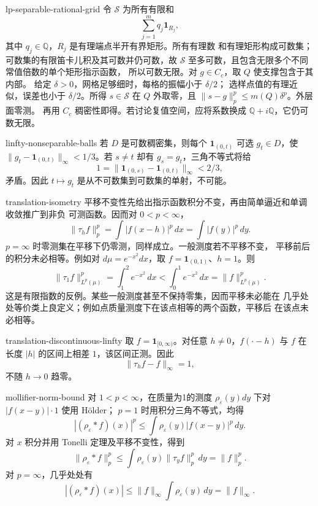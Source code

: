 \begin{solution}{lp-separable-rational-grid}
令 \(\mathcal S\) 为所有有限和
\[
 \sum_{j=1}^{m}q_j\mathbf1_{R_j},
\]
其中 \(q_j\in\mathbb Q\)，\(R_j\) 是有理端点半开有界矩形。所有有理数
和有理矩形构成可数集；可数集的有限笛卡儿积及其可数并仍可数，故
\(\mathcal S\) 至多可数，且包含无限多个不同常值倍数的单个矩形指示函数，
所以可数无限。对 \(g\in C_c\)，取 \(Q\) 使支撑包含于其内部。
给定 \(\delta>0\)，网格足够细时，每格的振幅小于 \(\delta/2\)；
选样点值的有理近似，误差也小于 \(\delta/2\)。所得 \(s\in\mathcal S\)
在 \(Q\) 外取零，且 \(\|s-g\|_p^p\le m(Q)\delta^p\)。外层面零测。
再用 \(C_c\) 稠密性即得。若讨论复值空间，应将系数换成
\(\mathbb Q+i\mathbb Q\)，它仍可数无限。
\end{solution}

\begin{solution}{linfty-nonseparable-balls}
若 \(D\) 是可数稠密集，则每个
\(\mathbf1_{(0,t)}\) 可选 \(g_t\in D\)，使
\(\|g_t-\mathbf1_{(0,t)}\|_\infty<1/3\)。若 \(s\ne t\) 却有
\(g_s=g_t\)，三角不等式将给
\[
 1=\|\mathbf1_{(0,s)}-\mathbf1_{(0,t)}\|_\infty<2/3,
\]
矛盾。因此 \(t\mapsto g_t\) 是从不可数集到可数集的单射，不可能。
\end{solution}

\begin{solution}{translation-isometry}
平移不变性先给出指示函数积分不变，再由简单逼近和单调收敛推广到非负
可测函数。因而对 \(0<p<\infty\)，
\[
 \|\tau_hf\|_p^p
 =\int|f(x-h)|^p\,dx
 =\int|f(y)|^p\,dy.
\]
\(p=\infty\) 时零测集在平移下仍零测，同样成立。一般测度若不平移不变，
平移前后的积分未必相等。例如对 \(d\mu=e^{-x^2}dx\)，取
\(f=\mathbf1_{(0,1)}\)、\(h=1\)。则
\[
 \|\tau_1f\|_{L^p(\mu)}^p=\int_1^2 e^{-x^2}\,dx
 <\int_0^1 e^{-x^2}\,dx=\|f\|_{L^p(\mu)}^p.
\]
这是有限指数的反例。某些一般测度甚至不保持零集，因而平移未必能在
几乎处处等价类上良定义；例如点质量测度下在该点相等的两个函数，平移后
在该点未必相等。
\end{solution}

\begin{solution}{translation-discontinuous-linfty}
取 \(f=\mathbf1_{[0,\infty)}\)。对任意 \(h\ne0\)，\(f(\cdot-h)\) 与
\(f\) 在长度 \(|h|\) 的区间上相差 \(1\)，该区间正测。因此
\[
 \|\tau_hf-f\|_\infty=1,
\]
不随 \(h\to0\) 趋零。
\end{solution}

\begin{solution}{mollifier-norm-bound}
对 \(1<p<\infty\)，在质量为1的测度
\(\rho_\varepsilon(y)dy\) 下对 \(|f(x-y)|\cdot1\) 使用 Hölder；
\(p=1\) 时用积分三角不等式，均得
\[
 |(\rho_\varepsilon*f)(x)|^p
 \le\int\rho_\varepsilon(y)|f(x-y)|^p\,dy.
\]
对 \(x\) 积分并用 Tonelli 定理及平移不变性，得到
\[
 \|\rho_\varepsilon*f\|_p^p
 \le\int\rho_\varepsilon(y)\|\tau_yf\|_p^p\,dy
 =\|f\|_p^p.
\]
对 \(p=\infty\)，几乎处处有
\[
 |(\rho_\varepsilon*f)(x)|
 \le\|f\|_\infty\int\rho_\varepsilon(y)\,dy
 =\|f\|_\infty.
\]
\end{solution}

